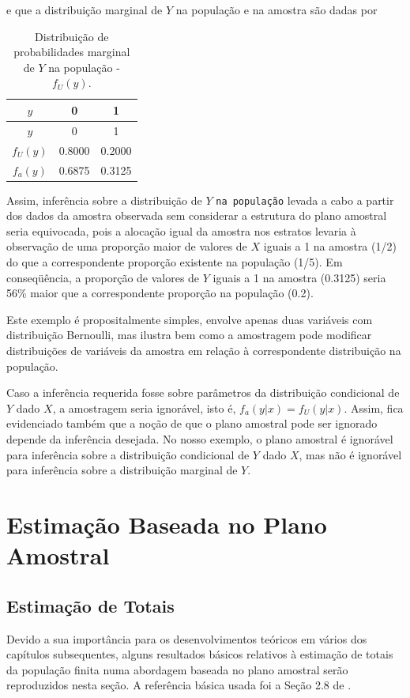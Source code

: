 \documentclass[]{book}
\theoremstyle{definition}
\theoremstyle{definition}
\theoremstyle{definition}
\theoremstyle{remark}
\begin{document}
e que a distribuição marginal de \(Y\) na população e na amostra são
dadas por

\begin{longtable}[]{@{}ccc@{}}
\caption{\label{tab:Tab28} Distribuição de probabilidades marginal de \(Y\)
na população - \(f_U( y )\).}\tabularnewline
\toprule
\(y\) & 0 & 1\tabularnewline
\midrule
\endfirsthead
\toprule
\(y\) & 0 & 1\tabularnewline
\midrule
\endhead
\(f_U(y)\) & 0.8000 & 0.2000\tabularnewline
\(f_a(y)\) & 0.6875 & 0.3125\tabularnewline
\bottomrule
\end{longtable}

Assim, inferência sobre a distribuição de \(Y\) \texttt{na\ população}
levada a cabo a partir dos dados da amostra observada sem considerar a
estrutura do plano amostral seria equivocada, pois a alocação igual da
amostra nos estratos levaria à observação de uma proporção maior de
valores de \(X\) iguais a 1 na amostra (1/2) do que a correspondente
proporção existente na população (1/5). Em conseqüência, a proporção de
valores de \(Y\) iguais a 1 na amostra (0.3125) seria 56\% maior que a
correspondente proporção na população (0.2).

Este exemplo é propositalmente simples, envolve apenas duas variáveis
com distribuição Bernoulli, mas ilustra bem como a amostragem pode
modificar distribuições de variáveis da amostra em relação à
correspondente distribuição na população.

Caso a inferência requerida fosse sobre parâmetros da distribuição
condicional de \(Y\) dado \(X\), a amostragem seria ignorável, isto é,
\(f_a ( y | x) = f_U (y | x)\). Assim, fica evidenciado também que a
noção de que o plano amostral pode ser ignorado depende da inferência
desejada. No nosso exemplo, o plano amostral é ignorável para inferência
sobre a distribuição condicional de \(Y\) dado \(X\), mas não é
ignorável para inferência sobre a distribuição marginal de \(Y\).

\chapter{Estimação Baseada no Plano Amostral}\label{capplanamo}

\section{Estimação de Totais}\label{estimatotais}

Devido a sua importância para os desenvolvimentos teóricos em vários dos
capítulos subsequentes, alguns resultados básicos relativos à estimação
de totais da população finita numa abordagem baseada no plano amostral
serão reproduzidos nesta seção. A referência básica usada foi a Seção
2.8 de \citep{SSW92}.
\end{document}
